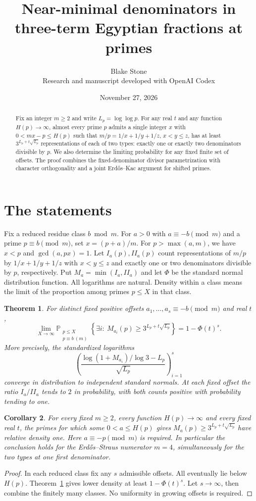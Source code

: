 \documentclass[11pt]{article}
\title{Near-minimal denominators in three-term Egyptian fractions at primes}
\author{Blake Stone\\\small Research and manuscript developed with OpenAI Codex}
\date{November 27, 2026}
\newtheorem{theorem}{Theorem}
\newtheorem{corollary}[theorem]{Corollary}
\newcommand{\PP}{\mathbb P}
\begin{document}
\maketitle
\begin{abstract}
Fix an integer $m\ge2$ and write $L_p=\log\log p$. For any real $t$ and any function $H(p)\to\infty$, almost every prime $p$ admits a single integer $x$ with $0<mx-p\le H(p)$ such that $m/p=1/x+1/y+1/z$, $x<y\le z$, has at least $3^{L_p+t\sqrt{L_p}}$ representations of each of two types: exactly one or exactly two denominators divisible by $p$. We also determine the limiting probability for any fixed finite set of offsets. The proof combines the fixed-denominator divisor parametrization with character orthogonality and a joint Erd\H{o}s--Kac argument for shifted primes.
\end{abstract}

\section{The statements}
Fix a reduced residue class $b\bmod m$. For $a>0$ with $a\equiv-b\pmod m$ and a prime $p\equiv b\pmod m$, set $x=(p+a)/m$. For $p>\max(a,m)$, we have $x<p$ and $\gcd(a,px)=1$. Let $I_a(p),II_a(p)$ count representations of $m/p$ by $1/x+1/y+1/z$ with $x<y\le z$ and exactly one or two denominators divisible by $p$, respectively. Put $M_a=\min(I_a,II_a)$ and let $\Phi$ be the standard normal distribution function. All logarithms are natural. Density within a class means the limit of the proportion among primes $p\le X$ in that class.

\begin{theorem}\label{finite}
For distinct fixed positive offsets $a_1,\ldots,a_s\equiv-b\pmod m$ and real $t$,
\[
 \lim_{X\to\infty}\PP_{\substack{p\le X\\p\equiv b\ (m)}}
 \left\{\exists i:\ M_{a_i}(p)\ge 3^{L_p+t\sqrt{L_p}}\right\}
 =1-\Phi(t)^s .
\]
More precisely, the standardized logarithms
\[
 \left(\frac{\log(1+M_{a_i})/\log 3-L_p}{\sqrt{L_p}}\right)_{i=1}^{s}
\]
converge in distribution to independent standard normals. At each fixed offset the ratio $I_a/II_a$ tends to $2$ in probability, with both counts positive with probability tending to one.
\end{theorem}

\begin{corollary}\label{infinite}
For every fixed $m\ge2$, every function $H(p)\to\infty$ and every fixed real $t$, the primes for which some $0<a\le H(p)$ gives $M_a(p)\ge 3^{L_p+t\sqrt{L_p}}$ have relative density one. Here $a\equiv-p\pmod m$ is required. In particular the conclusion holds for the Erd\H{o}s--Straus numerator $m=4$, simultaneously for the two types at one first denominator.
\end{corollary}
\begin{proof}
In each reduced class fix any $s$ admissible offsets. All eventually lie below $H(p)$. Theorem~\ref{finite} gives lower density at least $1-\Phi(t)^s$. Let $s\to\infty$, then combine the finitely many classes. No uniformity in growing offsets is required.
\end{proof}
\end{document}
